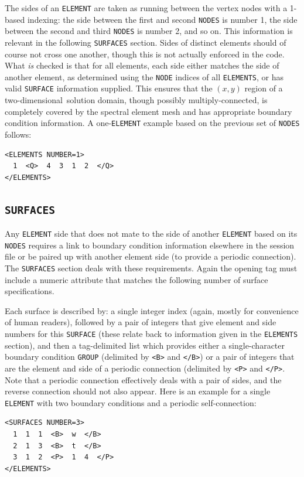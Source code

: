 \documentclass[11pt]{report}
\newcommand\twod{two-di\-men\-sion\-al}
\begin{document}
The sides of an \verb|ELEMENT| are taken as running between the vertex
nodes with a 1-based indexing: the side between the first and second
\verb|NODES| is number 1, the side between the second and third
\verb|NODES| is number 2, and so on.  This information is relevant in
the following \verb|SURFACES| section. Sides of distinct elements
should of course not cross one another, though this is not actually
enforced in the code.  What \emph{is} checked is that for all
elements, each side either matches the side of another element, as
determined using the \verb|NODE| indices of all \verb|ELEMENTS|, or
has valid \verb|SURFACE| information supplied.  This ensures that the
$(x,y)$ region of a \twod\ solution domain, though possibly
multiply-connected, is completely covered by the spectral element mesh
and has appropriate boundary condition information.  A
one-\verb|ELEMENT| example based on the previous set of \verb|NODES|
follows:
%
{\small
\begin{verbatim}
<ELEMENTS NUMBER=1>
  1  <Q>  4  3  1  2  </Q>
</ELEMENTS>
\end{verbatim}
}

\subsection{\texttt{SURFACES}}
\label{sec.surfaces}

Any \verb|ELEMENT| side that does not mate to the side of another
\verb|ELEMENT| based on its \verb|NODES| requires a link to boundary
condition information elsewhere in the session file or be paired up
with another element side (to provide a periodic connection).  The
\verb|SURFACES| section deals with these requirements.  Again the
opening tag must include a numeric attribute that matches the
following number of surface specifications.

Each surface is described by: a single integer index (again, mostly for
convenience of human readers), followed by a pair of integers that
give element and side numbers for this \verb|SURFACE| (these relate
back to information given in the \verb|ELEMENTS| section), and then a
tag-delimited list which provides either a single-character boundary
condition \verb|GROUP| (delimited by \verb|<B>| and \verb|</B>|) or a
pair of integers that are the element and side of a periodic
connection (delimited by \verb|<P>| and \verb|</P>|.  Note that a
periodic connection effectively deals with a pair of sides, and the
reverse connection should not also appear.  Here is an example for a
single \verb|ELEMENT| with two boundary conditions and a periodic
self-connection:
%
{\small
\begin{verbatim}
<SURFACES NUMBER=3>
  1  1  1  <B>  w  </B>
  2  1  3  <B>  t  </B>
  3  1  2  <P>  1  4  </P>
</ELEMENTS>
\end{verbatim}
}
\end{document}
